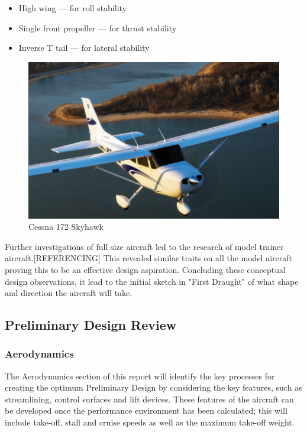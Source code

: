 \documentclass[12pt]{article}
\begin{document}
\begin{itemize}
\item{High wing --- for roll stability}
\item{Single front propeller --- for thrust stability}
\item{Inverse T tail --- for lateral stability}
\end{itemize}

\begin{figure}[h]
\includegraphics[width=\columnwidth]{cessna.jpg}
\centering
\caption{Cessna 172 Skyhawk}
\label{fig:cessna}
\end{figure}

\noindent Further investigations of full size aircraft led to the research of model trainer aircraft.[REFERENCING] This revealed similar traits on all the model aircraft proving this to be an effective design aspiration. Concluding these conceptual design observations, it lead to the initial sketch in "First Draught" of what shape and direction the aircraft will take. \\

\subsection{Preliminary Design Review}

\subsubsection{Aerodynamics}

\noindent The Aerodynamics section of this report will identify the key processes for creating the optimum Preliminary Design by considering the key features, such as streamlining, control surfaces and lift devices. These features of the aircraft can be developed once the performance environment has been calculated; this will include take-off, stall and cruise speeds as well as the maximum take-off weight. \\
\end{document}
